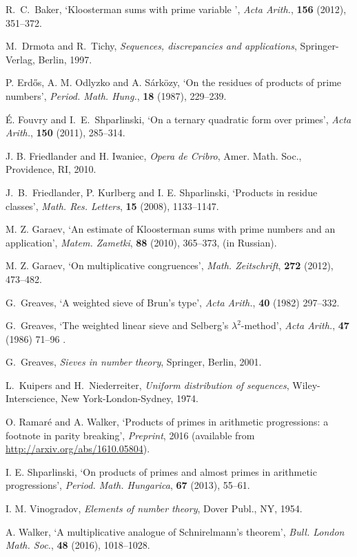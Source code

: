 \documentclass[12pt]{amsart}
\begin{document}
\begin{thebibliography}{99}

 R.~C.~Baker, `Kloosterman sums with prime variable ',
{\it Acta Arith.\/},  {\bf 156} (2012), 351--372.

 M.\ Drmota and R.\ Tichy,
{\it Sequences, discrepancies and applications\/},
Springer-Verlag, Berlin, 1997.

P. Erd{\H o}s, A. M. Odlyzko and A. S{\'a}rk{\"o}zy,
`On the residues of products of prime numbers',
{\it Period. Math. Hung.\/}, {\bf 18} (1987), 229--239.

 {\'E}. Fouvry and I.~E.~Shparlinski,  
`On a ternary quadratic form over primes', 
{\it Acta Arith.\/}, {\bf 150} (2011), 285--314.

 J. B. Friedlander and   H. Iwaniec,
{\it Opera de Cribro\/}, Amer.  Math.  Soc.,
Providence, RI, 2010.

J.~B.~Friedlander, P. Kurlberg and I. E. Shparlinski,
`Products in  residue classes',
{\it Math. Res. Letters\/},  {\bf 15} (2008), 
1133--1147.

  M. Z. Garaev, `An estimate of Kloosterman sums with
prime numbers and an application', 
{\it Matem. Zametki\/},  {\bf 88} (2010), 365--373,  (in Russian).

  M. Z. Garaev, `On multiplicative congruences', 
{\it Math. Zeitschrift\/},  {\bf 272} (2012), 473--482.
 
 
 G.~Greaves, `A weighted sieve of Brun's type',
{\it Acta Arith.\/},  {\bf 40} (1982) 297--332.

 G.~Greaves, `The weighted linear sieve and Selberg's $\lambda^2$-method',
{\it Acta Arith.\/},  {\bf 47} (1986) 71--96 .

 G.~Greaves, {\it Sieves in number theory\/},  Springer, Berlin, 2001.
 

L.\ Kuipers and H.\ Niederreiter, {\it Uniform distribution of
sequences\/}, Wiley-Interscience, New York-London-Sydney, 1974.

 O. Ramar{\'e} and A.  Walker, `Products of primes in arithmetic progressions: a footnote in parity breaking', 
{\it Preprint\/}, 2016 (available from \url{http://arxiv.org/abs/1610.05804}).

 I. E. Shparlinski, `On products of primes and almost primes in arithmetic 
progressions',  {\it Period. Math. Hungarica\/},   {\bf 67} (2013),  55--61.

I. M. Vinogradov, {\it Elements of number theory\/}, Dover Publ., NY, 1954.

 A.  Walker, `A multiplicative analogue of Schnirelmann's theorem', 
{\it Bull. London Math. Soc.\/},  {\bf 48} (2016), 1018--1028.

\end{thebibliography}
\end{document}
